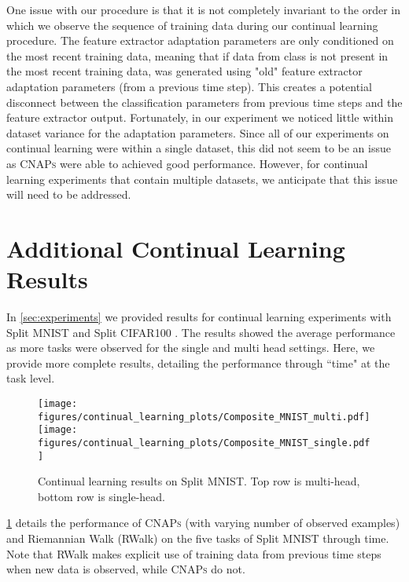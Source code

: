 \documentclass{article}
\theoremstyle{definition}
\newcommand{\cnaps}{\textsc{CNAPs}}
\begin{document}
One issue with our procedure is that it is not completely invariant to the order in which we observe the sequence of training data during our continual learning procedure. The feature extractor adaptation parameters are only conditioned on the most recent training data, meaning that if data from class  is not present in the most recent training data,  was generated using "old" feature extractor adaptation parameters (from a previous time step). This creates a potential disconnect between the classification parameters from previous time steps and the feature extractor output. Fortunately, in our experiment we noticed little within dataset variance for the adaptation parameters. Since all of our experiments on continual learning were within a single dataset, this did not seem to be an issue as \cnaps{} were able to achieved good performance. However, for continual learning experiments that contain multiple datasets, we anticipate that this issue will need to be addressed.


\section{Additional Continual Learning Results}
\label{app:additional_continual_learning_results}

In \cref{sec:experiments} we provided results for continual learning experiments with Split MNIST \citep{zenke2017continual} and Split CIFAR100 \citep{chaudhry2018riemannian}. The results showed the average performance as more tasks were observed for the single and multi head settings. Here, we provide more complete results, detailing the performance through ``time" at the task level. 
\begin{figure}[htb]
     \texttt{[image: figures/continual\_learning\_plots/Composite\_MNIST\_multi.pdf]} \\
    \texttt{[image: figures/continual\_learning\_plots/Composite\_MNIST\_single.pdf]} \\
    \caption{Continual learning results on Split MNIST. Top row is multi-head, bottom row is single-head.}
    \label{fig:continual_learning_mnist}
\end{figure}
\cref{fig:continual_learning_mnist} details the performance of \cnaps{} (with varying number of observed examples) and Riemannian Walk (RWalk) \citep{chaudhry2018riemannian} on the five tasks of Split MNIST through time. Note that RWalk makes explicit use of training data from previous time steps when new data is observed, while \cnaps{} do not. 
\end{document}

